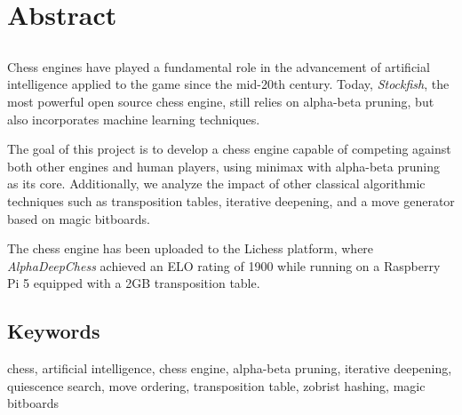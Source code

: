 \chapter*{Abstract}

\section*{\tituloPortadaEngVal}

Chess engines have played a fundamental role in the advancement of artificial intelligence applied to the game since the mid-20th century. Today, \textit{Stockfish}, the most powerful open source chess engine, still relies on alpha-beta pruning, but also incorporates machine learning techniques.

\vspace{1em}

\noindent The goal of this project is to develop a chess engine capable of competing against both other engines and human players, using minimax with alpha-beta pruning as its core. Additionally, we analyze the impact of other classical algorithmic techniques such as transposition tables, iterative deepening, and a move generator based on magic bitboards.

\vspace{1em}

The chess engine has been uploaded to the Lichess platform, where \textit{AlphaDeepChess} achieved an ELO rating of 1900 while running on a Raspberry Pi 5 equipped with a 2GB transposition table.

\section*{Keywords}

\noindent chess, artificial intelligence, chess engine, alpha-beta pruning, iterative deepening, quiescence search, move ordering, transposition table, zobrist hashing, magic bitboards
